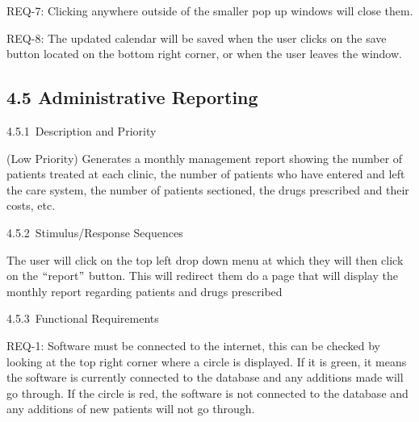 \documentclass[12pt]{article}
\renewcommand{\_}{\kern-1.5pt\textunderscore\kern-1.5pt}
\begin{document}
\begin{adjustwidth}{0.5in}{0.0in}
REQ-7: Clicking anywhere outside of the smaller pop up windows will close them.\par

\end{adjustwidth}

\begin{adjustwidth}{0.5in}{0.0in}
REQ-8: The updated calendar will be saved when the user clicks on the save button located on the bottom right corner, or when the user leaves the window.\par

\end{adjustwidth}


\vspace{\baselineskip}
\setlength{\parskip}{3.96pt}
\subsection*{4.5 \hspace*{10pt}Administrative Reporting}
\setlength{\parskip}{12.0pt}
4.5.1\  \tab Description and Priority\par

(Low Priority) Generates a monthly management report showing the number of patients treated at each clinic, the number of patients who have entered and left the care system, the number of patients sectioned, the drugs prescribed and their costs, etc.\par

4.5.2\  \tab Stimulus/Response Sequences\par

The user will click on the top left drop down menu at which they will then click on the $``$report$"$  button. This will redirect them do a page that will display the monthly report regarding patients and drugs prescribed\par

4.5.3\  \tab Functional Requirements\par

\begin{adjustwidth}{0.5in}{0.0in}
REQ-1: Software must be connected to the internet, this can be checked by looking at the top right corner where a circle is displayed. If it is green, it means the software is currently connected to the database and any additions made will go through. If the circle is red, the software is not connected to the database and any additions of new patients will not go through.\par

\end{adjustwidth}
\end{document}
